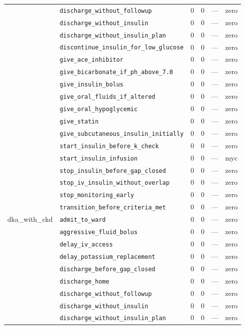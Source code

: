 \begin{table}[ht]
\begin{tabular}{llrrrl}
 & \texttt{discharge\_without\_followup} & 0 & 0 & — & zero \\
 & \texttt{discharge\_without\_insulin} & 0 & 0 & — & zero \\
 & \texttt{discharge\_without\_insulin\_plan} & 0 & 0 & — & zero \\
 & \texttt{discontinue\_insulin\_for\_low\_glucose} & 0 & 0 & — & zero \\
 & \texttt{give\_ace\_inhibitor} & 0 & 0 & — & zero \\
 & \texttt{give\_bicarbonate\_if\_ph\_above\_7.0} & 0 & 0 & — & zero \\
 & \texttt{give\_insulin\_bolus} & 0 & 0 & — & zero \\
 & \texttt{give\_oral\_fluids\_if\_altered} & 0 & 0 & — & zero \\
 & \texttt{give\_oral\_hypoglycemic} & 0 & 0 & — & zero \\
 & \texttt{give\_statin} & 0 & 0 & — & zero \\
 & \texttt{give\_subcutaneous\_insulin\_initially} & 0 & 0 & — & zero \\
 & \texttt{start\_insulin\_before\_k\_check} & 0 & 0 & — & zero \\
 & \texttt{start\_insulin\_infusion} & 0 & 0 & — & myc \\
 & \texttt{stop\_insulin\_before\_gap\_closed} & 0 & 0 & — & zero \\
 & \texttt{stop\_iv\_insulin\_without\_overlap} & 0 & 0 & — & zero \\
 & \texttt{stop\_monitoring\_early} & 0 & 0 & — & zero \\
 & \texttt{transition\_before\_criteria\_met} & 0 & 0 & — & zero \\
\midrule
dka\_with\_ckd & \texttt{admit\_to\_ward} & 0 & 0 & — & zero \\
 & \texttt{aggressive\_fluid\_bolus} & 0 & 0 & — & zero \\
 & \texttt{delay\_iv\_access} & 0 & 0 & — & zero \\
 & \texttt{delay\_potassium\_replacement} & 0 & 0 & — & zero \\
 & \texttt{discharge\_before\_gap\_closed} & 0 & 0 & — & zero \\
 & \texttt{discharge\_home} & 0 & 0 & — & zero \\
 & \texttt{discharge\_without\_followup} & 0 & 0 & — & zero \\
 & \texttt{discharge\_without\_insulin} & 0 & 0 & — & zero \\
 & \texttt{discharge\_without\_insulin\_plan} & 0 & 0 & — & zero \\

\end{tabular}
\end{table}
